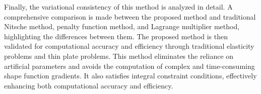 \documentclass[engineeringmaster]{hquThesis}
\begin{document}
\begin{abstractEn}
Finally, the variational consistency of this method is analyzed in detail. A comprehensive comparison is made between the proposed method and traditional Nitsche method, penalty function method, and Lagrange multiplier method, highlighting the differences between them. The proposed method is then validated for computational accuracy and efficiency through traditional elasticity problems and thin plate problems.
This method eliminates the reliance on artificial parameters and avoids the computation of complex and time-consuming shape function gradients. It also satisfies integral constraint conditions, effectively enhancing both computational accuracy and efficiency.
\end{abstractEn}
\tableofcontents





\mainmatter







\appendix
\setcounter{equation}{0}
\renewcommand\theequation{A.\arabic{equation}}
\renewcommand{\appendixname}{Appendix~\Alph{chapter}}


\renewcommand\theequation{B.\arabic{equation}}











% 
% 










\renewcommand{\appendixname}{Appendix~\Alph{chapter}}

\end{document}
